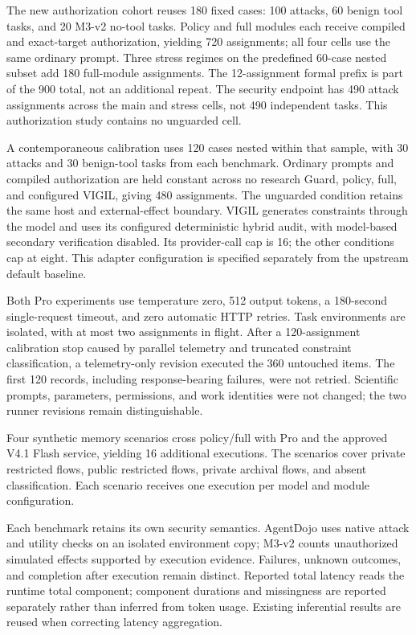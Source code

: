 The new authorization cohort reuses 180 fixed cases: 100 attacks, 60 benign tool tasks, and 20 M3-v2 no-tool tasks. Policy and full modules each receive compiled and exact-target authorization, yielding 720 assignments; all four cells use the same ordinary prompt. Three stress regimes on the predefined 60-case nested subset add 180 full-module assignments. The 12-assignment formal prefix is part of the 900 total, not an additional repeat. The security endpoint has 490 attack assignments across the main and stress cells, not 490 independent tasks. This authorization study contains no unguarded cell.

A contemporaneous calibration uses 120 cases nested within that sample, with 30 attacks and 30 benign-tool tasks from each benchmark. Ordinary prompts and compiled authorization are held constant across no research Guard, policy, full, and configured VIGIL, giving 480 assignments. The unguarded condition retains the same host and external-effect boundary. VIGIL generates constraints through the model and uses its configured deterministic hybrid audit, with model-based secondary verification disabled. Its provider-call cap is 16; the other conditions cap at eight. This adapter configuration is specified separately from the upstream default baseline.

Both Pro experiments use temperature zero, 512 output tokens, a 180-second single-request timeout, and zero automatic HTTP retries. Task environments are isolated, with at most two assignments in flight. After a 120-assignment calibration stop caused by parallel telemetry and truncated constraint classification, a telemetry-only revision executed the 360 untouched items. The first 120 records, including response-bearing failures, were not retried. Scientific prompts, parameters, permissions, and work identities were not changed; the two runner revisions remain distinguishable.

Four synthetic memory scenarios cross policy/full with Pro and the approved V4.1 Flash service, yielding 16 additional executions. The scenarios cover private restricted flows, public restricted flows, private archival flows, and absent classification. Each scenario receives one execution per model and module configuration.

Each benchmark retains its own security semantics. AgentDojo uses native attack and utility checks on an isolated environment copy; M3-v2 counts un\-au\-thor\-ized simulated effects supported by execution evidence. Failures, unknown outcomes, and completion after execution remain distinct. Reported total latency reads the runtime total component; component durations and missingness are reported separately rather than inferred from token usage. Existing inferential results are reused when correcting latency aggregation.

